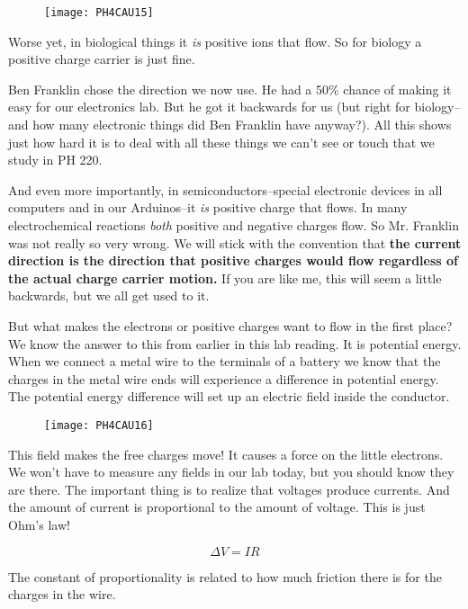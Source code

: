 \begin{figure}[h!]
     \centering
     \texttt{[image: PH4CAU15]}
\end{figure}

Worse yet, in biological things it \emph{is} positive ions that flow. So for biology a positive charge carrier is just fine.

Ben Franklin chose the direction we now use. He had a 50\% chance of making it easy for our electronics lab. But he got it backwards for us (but right for biology--and how many electronic things did Ben Franklin have anyway?). All this shows just how hard it is to deal with all these things we can't see or touch that we study in PH 220.

And even more importantly, in semiconductors--special electronic devices in all computers and in our Arduinos--it \emph{is} positive charge that flows. In many electrochemical reactions \emph{both} positive and negative charges flow. So Mr. Franklin was not really so very wrong. We will stick with the convention that \textbf{the current direction is the direction that positive charges would flow regardless of the actual charge carrier motion.} If you are like me, this will seem a little backwards, but we all get used to it.

But what makes the electrons or positive charges want to flow in the first place? We know the answer to this from earlier in this lab reading. It is potential energy. When we connect a metal wire to the terminals of a battery we know that the charges in the metal wire ends will experience a difference in potential energy. The potential energy difference will set up an electric field inside the conductor. 

\begin{figure}[h!]
	\centering
    \texttt{[image: PH4CAU16]}
\end{figure}

This field makes the free charges move! It causes a force on the little electrons. We won't have to measure any fields in our lab today, but you should know they are there. The important thing is to realize that voltages produce currents. And the amount of current is proportional to the amount of
voltage. This is just Ohm's law! 

\begin{equation*}
	\Delta V=IR
\end{equation*}

The constant of proportionality is related to how much friction there is for the charges in the wire.

